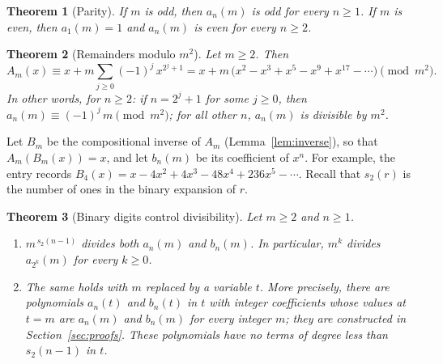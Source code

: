 \documentclass[11pt,a4paper]{article}
\newtheorem{theorem}{Theorem}[section]
\theoremstyle{definition}
\theoremstyle{remark}
\begin{document}
\begin{theorem}[Parity]\label{thm:parity}
If $m$ is odd, then $a_n(m)$ is odd for every $n\ge1$. If $m$ is even, then $a_1(m)=1$ and $a_n(m)$ is even for every
$n\ge2$.
\end{theorem}

\begin{theorem}[Remainders modulo $m^2$]\label{thm:modsq}
Let $m\ge2$. Then
\[
A_m(x)\equiv x+m\sum_{j\ge0}(-1)^j\,x^{2^j+1}=x+m\,\bigl(x^2-x^3+x^5-x^9+x^{17}-\cdots\bigr)\pmod{m^2}.
\]
In other words, for $n\ge2$: if $n=2^j+1$ for some $j\ge0$, then $a_n(m)\equiv(-1)^j\,m\pmod{m^2}$; for all other $n$,
$a_n(m)$ is divisible by $m^2$.
\end{theorem}

Let $B_m$ be the compositional inverse of $A_m$ (Lemma~\ref{lem:inverse}), so that $A_m(B_m(x))=x$, and let $b_n(m)$ be
its coefficient of $x^n$. For example, the entry records $B_{4}(x)=x-4x^2+4x^3-48x^4+236x^5-\cdots.$
Recall that $s_2(r)$ is the number of ones in the binary expansion of $r$.

\begin{theorem}[Binary digits control divisibility]\label{thm:binary}
Let $m\ge2$ and $n\ge1$.
\begin{enumerate}[label=(\alph*)]
\item $m^{\,s_2(n-1)}$ divides both $a_n(m)$ and $b_n(m)$. In particular, $m^k$ divides $a_{2^k}(m)$ for every $k\ge0$.
\item The same holds with $m$ replaced by a variable $t$. More precisely, there are polynomials $a_n(t)$ and $b_n(t)$
in $t$ with integer coefficients whose values at $t=m$ are $a_n(m)$ and $b_n(m)$ for every integer $m$; they are
constructed in Section~\ref{sec:proofs}. These polynomials have no terms of degree less than $s_2(n-1)$ in $t$.
\end{enumerate}
\end{theorem}
\end{document}
